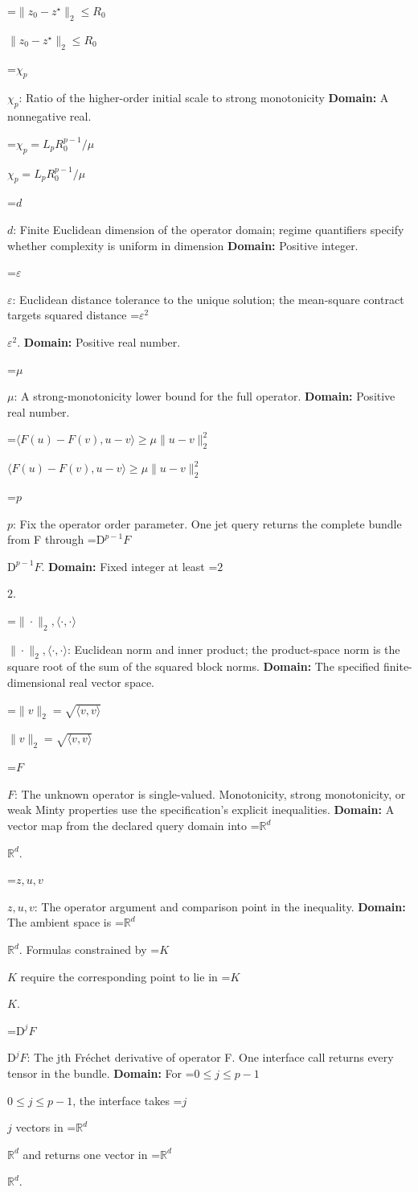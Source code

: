 \documentclass[10pt,a4paper]{article}
\newcommand{\AtlasMath}[1]{\par\begingroup\centering\setbox0=\hbox{$\displaystyle #1$}\ifdim\wd0>1.4\linewidth\typeout{ATLAS WIDE FORMULA: \the\wd0}\fi\ifdim\wd0>\linewidth\resizebox{\linewidth}{!}{\box0}\else\box0\fi\par\endgroup}
\newcommand{\AtlasInlineMath}[1]{\begingroup\setbox0=\hbox{$#1$}\ifdim\wd0>.4\linewidth\endgroup\AtlasMath{#1}\else\endgroup$#1$\fi}
\begin{document}
\AtlasInlineMath{\|z_0-z^\star\|_2\le R_0}

\AtlasInlineMath{\chi_p}: Ratio of the higher-order initial scale to strong monotonicity \textbf{Domain:} A nonnegative real.

\AtlasInlineMath{\chi_p=L_pR_0^{p-1}/\mu}

\AtlasInlineMath{d}: Finite Euclidean dimension of the operator domain; regime quantifiers specify whether complexity is uniform in dimension \textbf{Domain:} Positive integer.

\AtlasInlineMath{\varepsilon}: Euclidean distance tolerance to the unique solution; the mean-square contract targets squared distance \AtlasInlineMath{\varepsilon^2}. \textbf{Domain:} Positive real number.

\AtlasInlineMath{\mu}: A strong-monotonicity lower bound for the full operator. \textbf{Domain:} Positive real number.

\AtlasInlineMath{\langle F(u)-F(v),u-v\rangle\ge\mu\|u-v\|_2^2}

\AtlasInlineMath{p}: Fix the operator order parameter. One jet query returns the complete bundle from F through \AtlasInlineMath{\mathrm D^{p-1}F}. \textbf{Domain:} Fixed integer at least \AtlasInlineMath{2}.

\AtlasInlineMath{\|\cdot\|_2,\langle\cdot,\cdot\rangle}: Euclidean norm and inner product; the product-space norm is the square root of the sum of the squared block norms. \textbf{Domain:} The specified finite-dimensional real vector space.

\AtlasInlineMath{\|v\|_2=\sqrt{\langle v,v\rangle}}

\AtlasInlineMath{F}: The unknown operator is single-valued. Monotonicity, strong monotonicity, or weak Minty properties use the specification’s explicit inequalities. \textbf{Domain:} A vector map from the declared query domain into \AtlasInlineMath{\mathbb R^d}.

\AtlasInlineMath{z,u,v}: The operator argument and comparison point in the inequality. \textbf{Domain:} The ambient space is \AtlasInlineMath{\mathbb R^d}. Formulas constrained by \AtlasInlineMath{K} require the corresponding point to lie in \AtlasInlineMath{K}.

\AtlasInlineMath{\mathrm D^jF}: The jth Fréchet derivative of operator F. One interface call returns every tensor in the bundle. \textbf{Domain:} For \AtlasInlineMath{0\le j\le p-1}, the interface takes \AtlasInlineMath{j} vectors in \AtlasInlineMath{\mathbb R^d} and returns one vector in \AtlasInlineMath{\mathbb R^d}.
\end{document}
